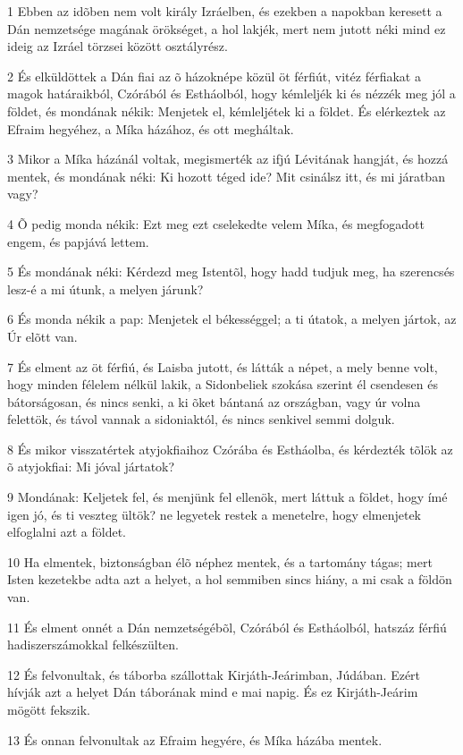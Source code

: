 \par 1 Ebben az idõben nem volt király Izráelben, és ezekben a napokban keresett a Dán nemzetsége magának örökséget, a hol lakjék, mert nem jutott néki mind ez ideig az Izráel törzsei között osztályrész.
\par 2 És elküldöttek a Dán fiai az õ házoknépe közül öt férfiút, vitéz férfiakat a magok határaikból, Czórából és Estháolból, hogy kémleljék ki és nézzék meg jól a földet, és mondának nékik: Menjetek el, kémleljétek ki a földet. És elérkeztek az Efraim hegyéhez, a Míka házához, és ott megháltak.
\par 3 Mikor a Míka házánál voltak, megismerték az ifjú Lévitának hangját, és hozzá mentek, és mondának néki: Ki hozott téged ide? Mit csinálsz itt, és mi járatban vagy?
\par 4 Õ pedig monda nékik: Ezt meg ezt cselekedte velem Míka, és megfogadott engem, és papjává lettem.
\par 5 És mondának néki: Kérdezd meg Istentõl, hogy hadd tudjuk meg, ha szerencsés lesz-é a mi útunk, a melyen járunk?
\par 6 És monda nékik a pap: Menjetek el békességgel; a ti útatok, a melyen jártok, az Úr elõtt van.
\par 7 És elment az öt férfiú, és Laisba jutott, és látták a népet, a mely benne volt, hogy minden félelem nélkül lakik, a Sidonbeliek szokása szerint él csendesen és bátorságosan, és nincs senki, a ki õket bántaná az országban, vagy úr volna felettök, és távol vannak a sidoniaktól, és nincs senkivel semmi dolguk.
\par 8 És mikor visszatértek atyjokfiaihoz Czórába és Estháolba, és kérdezték tõlök az õ atyjokfiai: Mi jóval jártatok?
\par 9 Mondának: Keljetek fel, és menjünk fel ellenök, mert láttuk a földet, hogy ímé igen jó, és ti veszteg ültök? ne legyetek restek a menetelre, hogy elmenjetek elfoglalni azt a földet.
\par 10 Ha elmentek, biztonságban élõ néphez mentek, és a tartomány tágas; mert Isten kezetekbe adta azt a helyet, a hol semmiben sincs hiány, a mi csak a földön van.
\par 11 És elment onnét a Dán nemzetségébõl, Czórából és Estháolból, hatszáz férfiú hadiszerszámokkal felkészülten.
\par 12 És felvonultak, és táborba szállottak Kirjáth-Jeárimban, Júdában. Ezért hívják azt a helyet Dán táborának mind e mai napig. És ez Kirjáth-Jeárim mögött fekszik.
\par 13 És onnan felvonultak az Efraim hegyére, és Míka házába mentek.
